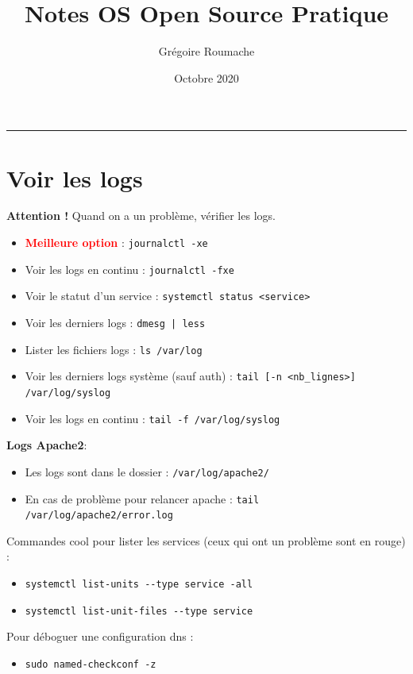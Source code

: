 \documentclass[a4paper]{article}
\title{Notes OS Open Source Pratique}
\author{Grégoire Roumache}
\date{Octobre 2020}
\begin{document}
\maketitle

\tableofcontents

\begin{center} \rule{0.95\linewidth}{0.1mm} \end{center}















\section{Voir les logs}




\textbf{Attention !} Quand on a un problème, vérifier les logs.
\begin{itemize}
    \item \textcolor{red}{\textbf{Meilleure option}} : \texttt{journalctl -xe}
    \item Voir les logs en continu : \texttt{journalctl -fxe}
    \item Voir le statut d'un service : \texttt{systemctl status <service>}
    \item Voir les derniers logs : \texttt{dmesg | less}
    \item Lister les fichiers logs : \texttt{ls /var/log}
    \item Voir les derniers logs système (sauf auth) : \texttt{tail [-n <nb\_lignes>] /var/log/syslog}
    \item Voir les logs en continu : \texttt{tail -f /var/log/syslog}
\end{itemize}
\textbf{Logs Apache2}:
\begin{itemize}
    \item Les logs sont dans le dossier : \texttt{/var/log/apache2/}
    \item En cas de problème pour relancer apache : \texttt{tail /var/log/apache2/error.log}
\end{itemize}
Commandes cool pour lister les services (ceux qui ont un problème sont en rouge) :
\begin{itemize}
    \item \texttt{systemctl list-units -{}-type service -all}
    \item \texttt{systemctl list-unit-files -{}-type service}
\end{itemize}
Pour déboguer une configuration dns :
\begin{itemize}
    \item \texttt{sudo named-checkconf -z}
\end{itemize}
\end{document}
